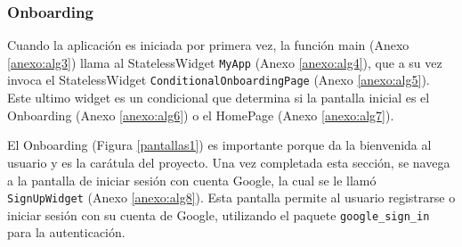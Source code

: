 





\subsubsection*{Onboarding}

Cuando la aplicación es iniciada por primera vez, la función main (Anexo \ref{anexo:alg3}) llama al StatelessWidget \texttt{MyApp} (Anexo \ref{anexo:alg4}), que a su vez invoca el StatelessWidget \texttt{ConditionalOnboardingPage} (Anexo \ref{anexo:alg5}). Este ultimo widget es un condicional que determina si la pantalla inicial es el Onboarding (Anexo \ref{anexo:alg6}) o el HomePage (Anexo \ref{anexo:alg7}).

El Onboarding (Figura \ref{pantallas1}) es importante porque da la bienvenida al usuario y es la carátula del proyecto. Una vez completada esta sección, se navega a la pantalla de iniciar sesión con cuenta Google, la cual se le llamó \texttt{SignUpWidget} (Anexo \ref{anexo:alg8}). Esta pantalla permite al usuario registrarse o iniciar sesión con su cuenta de Google, utilizando el paquete \texttt{google\_sign\_in} para la autenticación.

